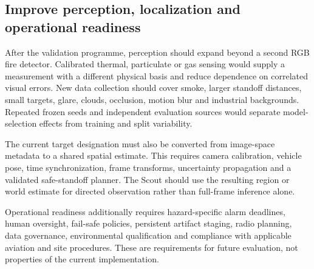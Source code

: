 \subsection{Improve perception, localization and operational readiness}

After the validation programme, perception should expand beyond a second RGB
fire detector. Calibrated thermal, particulate or gas sensing would supply a
measurement with a different physical basis and reduce dependence on correlated
visual errors. New data collection should cover smoke, larger standoff
distances, small targets, glare, clouds, occlusion, motion blur and industrial
backgrounds. Repeated frozen seeds and independent evaluation sources would
separate model-selection effects from training and split variability.

The current target designation must also be converted from image-space metadata
to a shared spatial estimate. This requires camera calibration, vehicle pose,
time synchronization, frame transforms, uncertainty propagation and a validated
safe-standoff planner. The Scout should use the resulting region or world
estimate for directed observation rather than full-frame inference alone.

Operational readiness additionally requires hazard-specific alarm deadlines,
human oversight, fail-safe policies, persistent artifact staging, radio
planning, data governance, environmental qualification and compliance with
applicable aviation and site procedures. These are requirements for future
evaluation, not properties of the current implementation.

